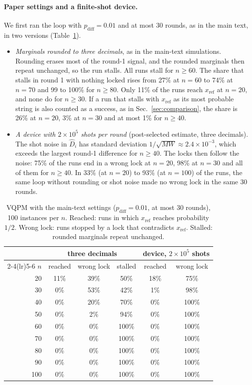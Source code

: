 \paragraph{Paper settings and a finite-shot device.} We first ran the loop with $p_{\mathrm{diff}}=0.01$ and at most 30 rounds, as in the main text, in two versions (Table~\ref{tab:app-large}).
\begin{itemize}
\item \emph{Marginals rounded to three decimals}, as in the main-text simulations. Rounding erases most of the round-1 signal, and the rounded marginals then repeat unchanged, so the run stalls. All runs stall for $n\ge60$. The share that stalls in round 1 with nothing locked rises from 27\% at $n=60$ to 74\% at $n=70$ and 99 to 100\% for $n\ge80$. Only 11\% of the runs reach $x_{\mathrm{ref}}$ at $n=20$, and none do for $n\ge30$. If a run that stalls with $x_{\mathrm{ref}}$ as its most probable string is also counted as a success, as in Sec.~\ref{sec:comparison}, the share is 26\% at $n=20$, 3\% at $n=30$ and at most 1\% for $n\ge40$.
\item \emph{A device with $2\times10^5$ shots per round} (post-selected estimate, three decimals). The shot noise in $\hat D_i$ has standard deviation $1/\sqrt{MW}\approx2.4\times10^{-3}$, which exceeds the largest round-1 difference for $n\ge40$. The locks then follow the noise: 75\% of the runs end in a wrong lock at $n=20$, 98\% at $n=30$ and all of them for $n\ge40$. In 33\% (at $n=20$) to 93\% (at $n=100$) of the runs, the same loop without rounding or shot noise made no wrong lock in the same 30 rounds.
\end{itemize}

\begin{table}[ht]
\centering
\small
\caption{VQPM with the main-text settings ($p_{\mathrm{diff}}=0.01$, at most 30 rounds), 100 instances per $n$. Reached: runs in which $x_{\mathrm{ref}}$ reaches probability $1/2$. Wrong lock: runs stopped by a lock that contradicts $x_{\mathrm{ref}}$. Stalled: rounded marginals repeat unchanged.}
\label{tab:app-large}
\begin{tabular}{r ccc cc}
\toprule
 & \multicolumn{3}{c}{three decimals} & \multicolumn{2}{c}{device, $2\times10^5$ shots} \\
\cmidrule(lr){2-4}\cmidrule(lr){5-6}
$n$ & reached & wrong lock & stalled & reached & wrong lock \\
\midrule
20 & 11\% & 39\% & 50\% & 18\% & 75\% \\
30 & 0\% & 53\% & 42\% & 1\% & 98\% \\
40 & 0\% & 20\% & 70\% & 0\% & 100\% \\
50 & 0\% & 2\% & 94\% & 0\% & 100\% \\
60 & 0\% & 0\% & 100\% & 0\% & 100\% \\
70 & 0\% & 0\% & 100\% & 0\% & 100\% \\
80 & 0\% & 0\% & 100\% & 0\% & 100\% \\
90 & 0\% & 0\% & 100\% & 0\% & 100\% \\
100 & 0\% & 0\% & 100\% & 0\% & 100\% \\
\bottomrule
\end{tabular}
\end{table}

